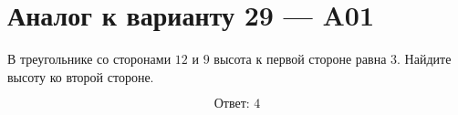 


\section*{Аналог к варианту 29 — A01}
В треугольнике со сторонами \(12\) и \(9\) высота к первой стороне равна \(3\). Найдите высоту ко второй стороне.
\begin{center}\figTriangleAltitudes\end{center}
\[\boxed{\text{Ответ: }4}\]

